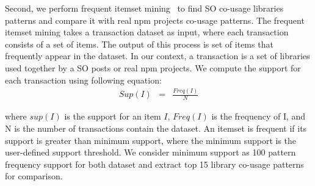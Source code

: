 \documentclass[paper]{ieice}
\begin{document}
Second, we perform frequent itemset mining~\cite{thung2013automated} to find SO co-usage libraries patterns and compare it with real npm projects co-usage patterns. 
The frequent itemset mining takes a transaction dataset as input, where each transaction consists of a set of items. 
The output of this process is set of items that frequently appear in the dataset. 
In our context, a transaction is a set of libraries used together by a SO posts or real npm projects. 
We compute the support for each transaction using following equation:
\begin{eqnarray}
    Sup(I) & = & {\frac{Freq (I)}{N}}
\end{eqnarray}

where $sup(I)$ is the support for an item $I$, $Freq(I)$ is the frequency of I, and N is the number of transactions contain the dataset. An itemset is frequent if its support is greater than minimum support, where the minimum support is the user-defined support threshold.
We consider minimum support as 100 pattern frequency support for both dataset and extract top 15 library co-usage patterns for comparison. 
\\
\end{document}
